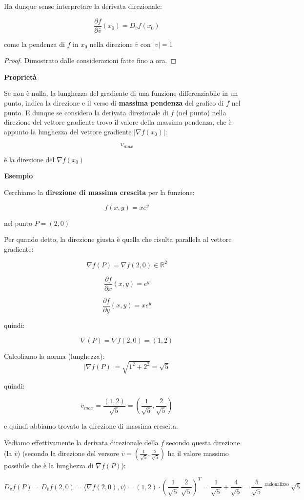 \documentclass[../appunti-analisi.tex]{subfiles}
\begin{document}
Ha dunque senso interpretare la derivata direzionale:

\[
    \frac{\partial f}{\partial \bar{v} } (x_0) = D_{\bar{v}}f(x_0)
\]

come la pendenza di $f$ in $x_0$ nella direzione $\bar{v} $ con $|v|=1$


\begin{proof}
       Dimostrato dalle considerazioni fatte fino a ora.    
\end{proof}

\textbf{Proprietà} 

Se non è nulla, la lunghezza del gradiente di una funzione differenziabile in un punto, indica la direzione e il verso di \textbf{massima pendenza}  del grafico di $f$ nel punto. E dunque se considero la derivata direzionale di $f$ (nel punto) nella direzione del vettore gradiente trovo il valore della massima pendenza, che è appunto la lunghezza del vettore gradiente $|\nabla f(x_0)|$:

\[
    v_{max} 
\]

è la direzione del $\nabla f(x_0)$


\textbf{Esempio} 

Cerchiamo la \textbf{direzione di massima crescita}  per la funzione:

\[
    f(x,y) = xe^{y}
\]

nel punto $P=(2,0)$

Per quando detto, la direzione giusta è quella che risulta parallela al vettore gradiente:

\[
    \nabla f(P) = \nabla f(2,0) \in \mathbb{R}^{2}
\]

\[
    \frac{\partial f}{\partial x}(x,y)  = e ^{y}
\]

\[
    \frac{\partial f}{\partial y}(x,y) = xe^{y}
\]

quindi:

\[
    \nabla(P) = \nabla f(2,0) = (1,2)
\]


Calcoliamo la norma (lunghezza):
\[
    |\nabla f(P) | = \sqrt{1^{2}+2^{2}} = \sqrt{5}
\]

quindi:

\[
    \bar{v}_{max} = \frac{(1,2)}{\sqrt{5}} = (\frac{1}{\sqrt{5}}, \frac{2}{\sqrt{5}})
\]

e quindi abbiamo trovato la direzione di massima crescita.


Vediamo effettivamente la derivata direzionale della $f$ secondo questa direzione (la $\bar{v}$) (secondo la direzione del versore $\bar{v} =( \frac{1}{\sqrt{5}}, \frac{2}{\sqrt{5}})$ ha il valore massimo possibile che è la lunghezza di $\nabla f(P)$):

\[
    D_{\bar{v} } f(P) = D_{\bar{v} } f(2,0) = \langle \nabla f(2,0), \bar{v}  \rangle = (1,2) \cdot (\frac{1}{\sqrt{5}}\ \frac{2}{\sqrt{5}})^{T} = \frac{1}{\sqrt{5}}+ \frac{4}{\sqrt{5}} = \frac{5}{\sqrt{5}} \overset{\text{razionalizzo}}{=} \sqrt{5}
\]
\end{document}

